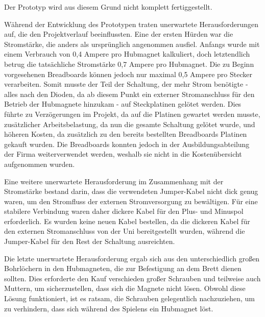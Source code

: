 Der Prototyp wird aus diesem Grund nicht komplett fertiggestellt.

Während der Entwicklung des Prototypen traten unerwartete Herausforderungen auf, die den Projektverlauf beeinflussten.
Eine der ersten Hürden war die Stromstärke, die anders als ursprünglich angenommen ausfiel. Anfangs wurde mit einem
Verbrauch von 0,4 Ampere pro Hubmagnet kalkuliert, doch letztendlich betrug die tatsächliche Stromstärke 0,7 Ampere pro
Hubmagnet. Die zu Beginn vorgesehenen Breadboards können jedoch nur maximal 0,5 Ampere pro Stecker verarbeiten.
Somit musste der Teil der Schaltung, der mehr Strom benötigte - alles nach den Dioden, da ab diesem Punkt ein externer
Stromanschluss für den Betrieb der Hubmagnete hinzukam - auf Steckplatinen gelötet werden. Dies führte zu Verzögerungen
im Projekt, da auf die Platinen gewartet werden musste, zusätzlicher Arbeitsbelastung, da nun die gesamte Schaltung gelötet
wurde, und höheren Kosten, da zusätzlich zu den bereits bestellten Breadboards Platinen gekauft wurden.
Die Breadboards konnten jedoch in der Ausbildungsabteilung der Firma weiterverwendet werden, weshalb sie nicht in die
Kostenübersicht aufgenommen wurden.

Eine weitere unerwartete Herausforderung im Zusammenhang mit der Stromstärke bestand darin, dass die verwendeten
Jumper-Kabel nicht dick genug waren, um den Stromfluss der externen Stromversorgung zu bewältigen. Für eine stabilere
Verbindung waren daher dickere Kabel für den Plus- und Minuspol erforderlich. Es wurden keine neuen Kabel bestellen,
da die dickeren Kabel für den externen Stromanschluss von der Uni bereitgestellt wurden, während die Jumper-Kabel für den
Rest der Schaltung ausreichten.

Die letzte unerwartete Herausforderung ergab sich aus den unterschiedlich großen Bohrlöchern in den Hubmagneten, die zur
Befestigung an dem Brett dienen sollten. Dies erforderte den Kauf verschieden großer Schrauben und teilweise auch Muttern,
um sicherzustellen, dass sich die Magnete nicht lösen. Obwohl diese Lösung funktioniert, ist es ratsam, die Schrauben
gelegentlich nachzuziehen, um zu verhindern, dass sich während des Spielens ein Hubmagnet löst.

